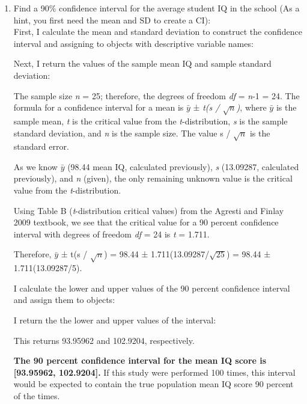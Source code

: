\documentclass[12pt,letterpaper]{article}
\begin{document}
	\begin{enumerate}
		\item Find a 90\% confidence interval for the average student IQ in the school (As a hint, you first need the mean and SD to create a CI):\\
		
		First, I calculate the mean and standard deviation to construct the confidence interval and assigning to objects with descriptive variable names:
		
		
		Next, I return the values of the sample mean IQ and sample standard deviation:
		

		
		The sample size \textit{n} = 25; therefore, the degrees of freedom \textit{df} = \textit{n}-1 = 24. The formula for a confidence interval for a mean is $\bar{y}$ ± \textit{t(s / $\sqrt{n}$)}, where $\bar{y}$ is the sample mean, \textit{t} is the critical value from the  \textit{t}-distribution, \textit{s} is the sample standard deviation, and \textit{n} is the sample size. The value s / $\sqrt{n}$ is the standard error.
		
		As we know $\bar{y}$ (98.44 mean IQ, calculated previously), \textit{s} (13.09287, calculated previously), and \textit{n} (given), the only remaining unknown value is the critical value from the \textit{t}-distribution. 
		
		Using Table B (\textit{t}-distribution critical values) from the Agresti and Finlay 2009 textbook, we see that the critical value for a 90 percent confidence interval with degrees of freedom \textit{df} = 24 is \textit{t} = 1.711.
		
		Therefore, $\bar{y}$ ± t(s / $\sqrt{n}$) = 98.44 ± 1.711(13.09287/$\sqrt{25}$)
		= 98.44 ± 1.711(13.09287/5).
		
		I calculate the lower and upper values of the 90 percent confidence interval and assign them to objects: 
		
		
		I return the the lower and upper values of the interval:
		
		
		This returns 93.95962 and 102.9204, respectively.
		
		\textbf{The 90 percent confidence interval for the mean IQ score is [93.95962, 102.9204].} If this study were performed 100 times, this interval would be expected to contain the true population mean IQ score 90 percent of the times. 
		

\end{enumerate}
\end{document}
